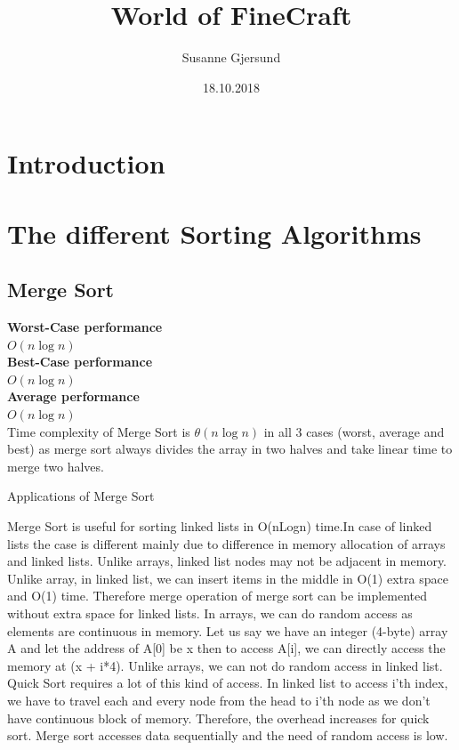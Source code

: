\documentclass{article}
\title{World of FineCraft}
\author{Susanne Gjersund}
\date{18.10.2018}
\begin{document}
	
	
	\maketitle
	\newpage
	\maketitle
	\tableofcontents
	\newpage


\section{Introduction}
	





\section{The different Sorting Algorithms}


\subsection{Merge Sort}


\textbf{Worst-Case performance}\\ 
$O(n\log n)$ \\
\textbf{Best-Case performance}\\ 
$O(n\log n)$ \\
\textbf{Average performance}\\ 
$O(n\log n)$ \\


Time complexity of Merge Sort is $\theta(n\log n)$ in all 3 cases (worst, average and best) as merge sort always divides the array in two halves and take linear time to merge two halves.


Applications of Merge Sort

Merge Sort is useful for sorting linked lists in O(nLogn) time.In case of linked lists the case is different mainly due to difference in memory allocation of arrays and linked lists. Unlike arrays, linked list nodes may not be adjacent in memory. Unlike array, in linked list, we can insert items in the middle in O(1) extra space and O(1) time. Therefore merge operation of merge sort can be implemented without extra space for linked lists.
In arrays, we can do random access as elements are continuous in memory. Let us say we have an integer (4-byte) array A and let the address of A[0] be x then to access A[i], we can directly access the memory at (x + i*4). Unlike arrays, we can not do random access in linked list. Quick Sort requires a lot of this kind of access. In linked list to access i’th index, we have to travel each and every node from the head to i’th node as we don’t have continuous block of memory. Therefore, the overhead increases for quick sort. Merge sort accesses data sequentially and the need of random access is low.
\end{document}
